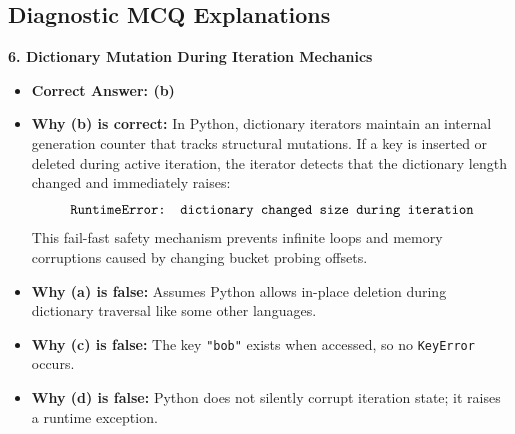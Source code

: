 \subsection*{Diagnostic MCQ Explanations}

\textbf{6. Dictionary Mutation During Iteration Mechanics}
\begin{itemize}
    \item \textbf{Correct Answer: (b)}
    \item \textbf{Why (b) is correct:}
    In Python, dictionary iterators maintain an internal generation counter that tracks structural mutations. If a key is inserted or deleted during active iteration, the iterator detects that the dictionary length changed and immediately raises:
    \begin{equation*}
    \text{\texttt{RuntimeError: dictionary changed size during iteration}}
    \end{equation*}
    This fail-fast safety mechanism prevents infinite loops and memory corruptions caused by changing bucket probing offsets.
    \item \textbf{Why (a) is false:} Assumes Python allows in-place deletion during dictionary traversal like some other languages.
    \item \textbf{Why (c) is false:} The key \texttt{"bob"} exists when accessed, so no \texttt{KeyError} occurs.
    \item \textbf{Why (d) is false:} Python does not silently corrupt iteration state; it raises a runtime exception.
\end{itemize}

